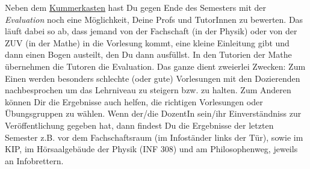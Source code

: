 \noindent Neben dem \hyperref[kummerkasten]{Kummerkasten} hast Du gegen Ende des
Semesters mit der \emph{Evaluation} noch eine Möglichkeit, Deine Profs und
TutorInnen zu bewerten. Das läuft dabei so ab, dass jemand von der Fachschaft
(in der Physik) oder von der ZUV (in der Mathe) in die Vorlesung kommt, eine
kleine Einleitung gibt und dann einen Bogen austeilt, den Du dann ausfüllst. In
den Tutorien der Mathe übernehmen die Tutoren die Evaluation.  Das ganze dient
zweierlei Zwecken: Zum Einen werden besonders schlechte (oder gute) Vorlesungen
mit den Dozierenden nachbesprochen um das Lehrniveau zu steigern bzw. zu
halten. Zum Anderen können Dir die Ergebnisse auch helfen, die richtigen
Vorlesungen oder Übungsgruppen zu wählen. Wenn der/die DozentIn sein/ihr
Einverständniss zur Veröffentlichung gegeben hat, dann findest Du die
Ergebnisse der letzten Semester z.B. vor dem Fachschaftsraum (im
Infoständer links der Tür), sowie im \gls{KIP}, im Hörsaalgebäude der Physik
(\Gls{INF} 308) und am Philosophenweg, jeweils an Infobrettern.
